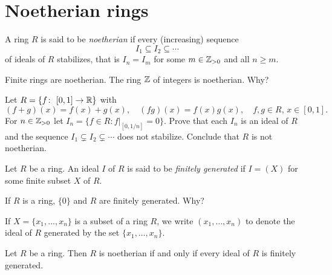 \section{Noetherian rings}
\lecture\label{lec:NoetherianRings}

\begin{definition}
	A ring $R$ is said to be \emph{noetherian} if every (increasing)
	sequence \[
 I_1\subseteq I_2\subseteq\cdots
 \]
 of ideals of $R$
	stabilizes, that is $I_n=I_m$ for some $m\in\mathbb{Z}_{>0}$ and all $n\geq m$. 
\end{definition}

Finite rings
are noetherian. The ring $\mathbb{Z}$ of integers is noetherian. Why?

\begin{exercise}
Let $R=\{f\colon [0,1]\to\R\}$ with 
\[
(f+g)(x)=f(x)+g(x),
\quad
(fg)(x)=f(x)g(x),
\quad
f,g\in R,\,x\in [0,1].
\]
For $n\in\mathbb{Z}_{>0}$ let
$I_n=\{f\in R:f|_{[0,1/n]}=0\}$. Prove that each $I_n$ is an ideal of $R$ and 
the sequence 
$I_1\subsetneq I_2\subsetneq\cdots$ 
does not stabilize. Conclude that $R$ is not noetherian. 
\end{exercise}

\begin{definition}
	Let $R$ be a ring. An ideal $I$ of $R$ 
	is said to be \emph{finitely generated} if $I=(X)$ for some
	finite subset $X$ of $R$. 
\end{definition}

If $R$ is a ring, $\{0\}$ and $R$ are finitely generated. Why?

If $X=\{x_1,\dots,x_n\}$ is a subset of a ring $R$, 
we write $(x_1,\dots,x_n)$ to denote 
the ideal of $R$ generated by the set $\{x_1,\dots,x_n\}$. 

\begin{proposition}
Let $R$ be a ring. Then $R$ is noetherian if and only 
if every ideal of $R$ is finitely generated. 	
\end{proposition}

